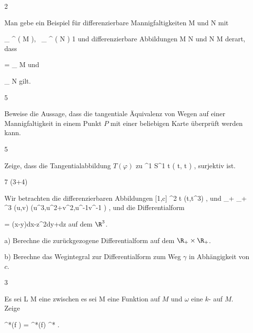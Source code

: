 {2}
{

Man gebe ein Beispiel für differenzierbare Mannigfaltigkeiten
\mathkor {} {M} {und} {N} {}
mit

\mavergleichskette
{\vergleichskette
{ _{  } ^{  }  \left(   M   \right), \, _{  } ^{  }  \left(   N   \right)
}
{ \geq }{ 1
}
{  }{
}
{    }{
}
{   }{
}
}
{}{}{}
und differenzierbare Abbildungen
\maabb {\varphi} { M } { N
} {}
und
\maabb {\psi} { N } { M
} {}
derart, dass

\mavergleichskette
{\vergleichskette
{ \psi \circ \varphi
}
{ = }{
_{ M }
}
{  }{
}
{    }{
}
{   }{
}
}
{}{}{}
und

\mavergleichskette
{\vergleichskette
{\varphi \circ  \psi
}
{ \neq }{
_{ N }
}
{  }{
}
{    }{
}
{   }{
}
}
{}{}{}
gilt.

}
{} {}

{5}
{

Beweise die Aussage, dass die tangentiale Äquivalenz von Wegen auf einer Mannigfaltigkeit in einem Punkt $P$ mit einer beliebigen Karte überprüft werden kann.

}
{} {}

{5}
{

Zeige, dass die Tangentialabbildung $T(\varphi)$ zu
\maabbeledisp {\varphi} {\R^1} {S^1
} { t } {( \cos  t, \sin  t  )
} {,}
surjektiv ist.

}
{} {}

{7 (3+4)}
{

Wir betrachten die differenzierbaren Abbildungen
\maabbeledisp {\gamma} { [1,c] } {\R^2
} { t } {(t,t^{3})
} {,}
 {} {}
und
\maabbeledisp {\varphi} {\R_+ \times \R_+ } {\R^3
} {(u,v)} {(u^3,u^2+v^2,u^{-1}v^{-1} )
} {,}
und die Differentialform

\mavergleichskettedisp
{\vergleichskette
{ \omega
}
{ =} { (x-y)dx-z^2dy+dz
}
{ } {
}
{ } {
}
{ } {
}
}
{}{}{}
auf dem $\R^3$.

a) Berechne die zurückgezogene Differentialform
\mathl{\varphi^* \omega}{} auf dem $\R_+ \times \R_+$.

b) Berechne das Wegintegral zur Differentialform
\mathl{\varphi^* \omega}{} zum Weg $\gamma$ in Abhängigkeit von $c$.

}
{} {}

{3}
{

Es sei
\maabbdisp {\psi} { L } { M
} {}
eine
zwischen
es sei
 { M } {\R
} {}
eine Funktion auf $M$ und $\omega$ eine
$k$-
auf $M$. Zeige

\mavergleichskettedisp
{\vergleichskette
{ \psi^*(f \omega)
}
{ =} { \psi^*(f)  \psi^* \omega
}
{ } {
}
{ } {
}
{ } {
}
}
{}{}{.}

}
{} {}


